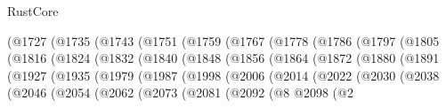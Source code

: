 \begin{lexlean}{RustCore}
\begin{coremodule}
                      (@1727
                        (@1735
                          (@1743
                            (@1751
                              (@1759
                                (@1767
                                  (@1778
                                    (@1786
                                      (@1797
                                        (@1805
                                          (@1816
                                            (@1824
                                              (@1832
                                                (@1840
                                                  (@1848
                                                    (@1856
                                                      (@1864
                                                        (@1872
                                                          (@1880
                                                            (@1891
                                                              (@1927
                                                                (@1935
                                                                  (@1979
                                                                    (@1987
                                                                      (@1998
                                                                        (@2006
                                                                          (@2014
                                                                            (@2022
                                                                              (@2030
                                                                                (@2038
                                                                                  (@2046
                                                                                    (@2054
                                                                                      (@2062
                                                                                        (@2073
                                                                                          (@2081
                                                                                            (@2092
                                                                                              (@8
                                                                                                @2098
                                                                                                (@2

\end{coremodule}
\end{lexlean}
